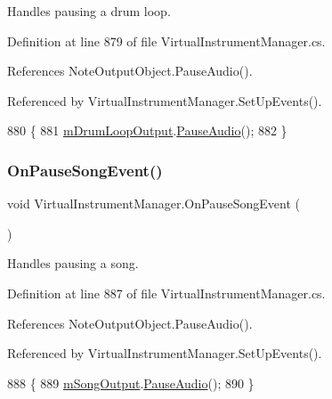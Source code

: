 Handles pausing a drum loop. 



Definition at line 879 of file Virtual\+Instrument\+Manager.\+cs.



References Note\+Output\+Object.\+Pause\+Audio().



Referenced by Virtual\+Instrument\+Manager.\+Set\+Up\+Events().


\begin{DoxyCode}
880     \{
881         \hyperlink{group___v_i_m_priv_ga5f71cb71d240042312dcc13b481b068d}{mDrumLoopOutput}.\hyperlink{group___n_o_o_pub_func_ga7977bc941f355866c7e4c141a8f7b8bb}{PauseAudio}();
882     \}
\end{DoxyCode}
\mbox{\label{group___v_i_m_handlers_gad052b3cc53b35b25631f9b399be489ae}} 
\subsubsection{\texorpdfstring{On\+Pause\+Song\+Event()}{OnPauseSongEvent()}}
{\footnotesize\ttfamily void Virtual\+Instrument\+Manager.\+On\+Pause\+Song\+Event (\begin{DoxyParamCaption}{ }\end{DoxyParamCaption})}



Handles pausing a song. 



Definition at line 887 of file Virtual\+Instrument\+Manager.\+cs.



References Note\+Output\+Object.\+Pause\+Audio().



Referenced by Virtual\+Instrument\+Manager.\+Set\+Up\+Events().


\begin{DoxyCode}
888     \{
889         \hyperlink{group___v_i_m_priv_gaa8d4f5642f5ac4dca4f4178b0052c78d}{mSongOutput}.\hyperlink{group___n_o_o_pub_func_ga7977bc941f355866c7e4c141a8f7b8bb}{PauseAudio}();
890     \}
\end{DoxyCode}
\mbox{\label{group___v_i_m_handlers_gae2e2010b9a36ae2409466181ae0b9679}} 
